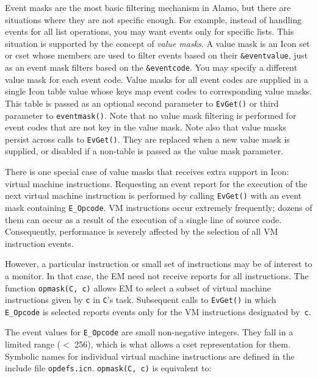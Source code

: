 Event masks are the most basic filtering mechanism in Alamo, but there are
situations where they are not specific enough.  For example, instead of
handling events for all list operations, you may want events only for
specific lists.  This situation is supported by the concept of {\em value
masks}.  A value mask is an Icon set or cset whose members are used to
filter events based on their {\tt \&eventvalue}, just as an event mask
filters based on the {\tt \&eventcode}.  You may specify a different value
mask for each event code.  Value masks for all event codes are supplied in a
single Icon table value whose keys map event codes to corresponding value
masks.  This table is passed as an optional second parameter to {\tt EvGet()}
or third parameter to {\tt eventmask()}.  Note that no value mask filtering
is performed for event codes that are not key in the value mask.  Note also
that value masks persist across calls to {\tt EvGet()}. They are replaced
when a new value mask is supplied, or disabled if a non-table is
passed as the value mask parameter.

There is one special case of value masks that receives extra support in
Icon: virtual machine instructions.
Requesting an event report for the execution of the next virtual
machine instruction is performed by calling {\tt EvGet()} with an event
mask containing {\tt E\_Opcode}.  VM instructions occur
extremely frequently; dozens of them can occur as a result of the
execution of a single line of source code.  Consequently, performance
is severely affected by the selection of all VM instruction events.

However, a particular instruction or small set of instructions
may be of interest to a monitor.  In that case, the EM need not
receive reports for all instructions.  The function {\tt opmask(C, c)}
allows EM to select a subset of virtual machine instructions given by
{\tt c} in {\tt C}'s task.  Subsequent calls to {\tt EvGet()} in
which {\tt E\_Opcode} is selected reports events only for the VM
instructions designated by~{\tt c}.

The event values for {\tt E\_Opcode} are small non-negative integers.  They
fall in a limited range ($<$ 256), which is what allows a cset
representation for them.  Symbolic names for individual virtual machine
instructions are defined in the include file {\tt opdefs.icn}.
{\tt opmask(C, c)} is equivalent to:

{}
\vspace{-1.5pc}

